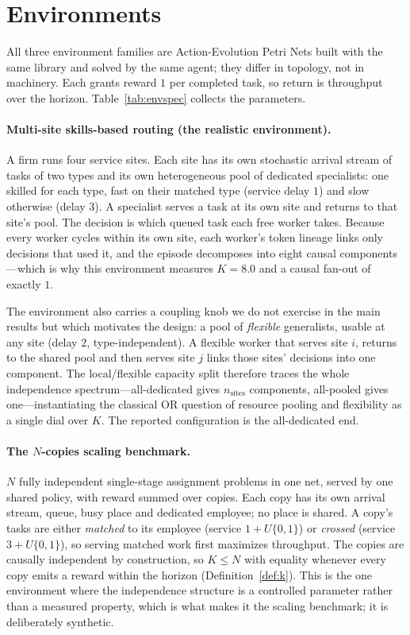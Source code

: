 \documentclass[review,authoryear,3p,times]{elsarticle}
\begin{document}
\section{Environments}
\label{app:envs}

All three environment families are Action-Evolution Petri Nets built with the
same library and solved by the same agent; they differ in topology, not in
machinery. Each grants reward $1$ per completed task, so return is throughput
over the horizon. Table~\ref{tab:envspec} collects the parameters.

\paragraph{Multi-site skills-based routing (the realistic environment).}
A firm runs four service sites. Each site has its own stochastic arrival stream
of tasks of two types and its own heterogeneous pool of dedicated specialists:
one skilled for each type, fast on their matched type (service delay $1$) and
slow otherwise (delay $3$). A specialist serves a task at its own site and
returns to that site's pool. The decision is which queued task each free worker
takes. Because every worker cycles within its own site, each worker's token
lineage links only decisions that used it, and the episode decomposes into eight
causal components---which is why this environment measures $K=8.0$ and a causal
fan-out of exactly $1$.

The environment also carries a coupling knob we do not exercise in the main
results but which motivates the design: a pool of \emph{flexible} generalists,
usable at any site (delay $2$, type-independent). A flexible worker that serves
site $i$, returns to the shared pool and then serves site $j$ links those sites'
decisions into one component. The local/flexible capacity split therefore traces
the whole independence spectrum---all-dedicated gives $n_{\mathrm{sites}}$
components, all-pooled gives one---instantiating the classical
OR question of resource pooling and flexibility as a single dial over $K$. The
reported configuration is the all-dedicated end.

\paragraph{The $N$-copies scaling benchmark.}
$N$ fully independent single-stage assignment problems in one net, served by one
shared policy, with reward summed over copies. Each copy has its own arrival
stream, queue, busy place and dedicated employee; no place is shared. A copy's
tasks are either \emph{matched} to its employee (service $1+U\{0,1\}$) or
\emph{crossed} (service $3+U\{0,1\}$), so serving matched work first maximizes
throughput. The copies are causally independent by construction, so $K\le N$
with equality whenever every copy emits a reward within the horizon
(Definition~\ref{def:k}). This is the one environment where the independence
structure is a controlled parameter rather than a measured property, which is
what makes it the scaling benchmark; it is deliberately synthetic.
\end{document}

